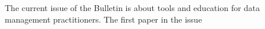 \documentclass[11pt]{article}
\begin{document}
The current issue of the Bulletin is about tools and education for data management practitioners. The first paper in the issue 
\end{document}
